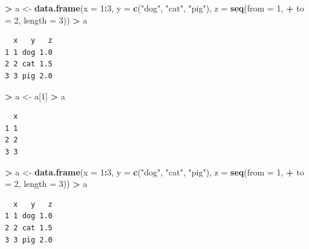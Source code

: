 \documentclass[]{krantz}
\makeatletter
\newenvironment{Shaded}{\begin{snugshade}}{\end{snugshade}}
\newcommand{\DataTypeTok}[1]{\textcolor[rgb]{0.27,0.27,0.27}{#1}}
\newcommand{\DecValTok}[1]{\textcolor[rgb]{0.06,0.06,0.06}{#1}}
\newcommand{\KeywordTok}[1]{\textcolor[rgb]{0.27,0.27,0.27}{\textbf{#1}}}
\newcommand{\NormalTok}[1]{#1}
\newcommand{\OperatorTok}[1]{\textcolor[rgb]{0.43,0.43,0.43}{\textbf{#1}}}
\newcommand{\StringTok}[1]{\textcolor[rgb]{0.5,0.5,0.5}{#1}}
\newenvironment{kframe}{%
\medskip{}
\setlength{\fboxsep}{.8em}
 \def\at@end@of@kframe{}%
 \ifinner\ifhmode%
  \def\at@end@of@kframe{\end{minipage}}%
  \begin{minipage}{\columnwidth}%
 \fi\fi%
 \def\FrameCommand##1{\hskip\@totalleftmargin \hskip-\fboxsep
 \colorbox{shadecolor}{##1}\hskip-\fboxsep
     \hskip-\linewidth \hskip-\@totalleftmargin \hskip\columnwidth}%
 \MakeFramed {\advance\hsize-\width
   \@totalleftmargin\z@ \linewidth\hsize
   \@setminipage}}%
 {\par\unskip\endMakeFramed%
 \at@end@of@kframe}
\renewenvironment{Shaded}{\begin{kframe}}{\end{kframe}}
\makeatother
\begin{document}
\begin{Shaded}
\begin{Highlighting}[]
\OperatorTok{>}\StringTok{ }\NormalTok{a <-}\StringTok{ }\KeywordTok{data.frame}\NormalTok{(}\DataTypeTok{x =} \DecValTok{1}\OperatorTok{:}\DecValTok{3}\NormalTok{, }\DataTypeTok{y =} \KeywordTok{c}\NormalTok{(}\StringTok{"dog"}\NormalTok{, }\StringTok{"cat"}\NormalTok{, }\StringTok{"pig"}\NormalTok{), }\DataTypeTok{z =} \KeywordTok{seq}\NormalTok{(}\DataTypeTok{from =} \DecValTok{1}\NormalTok{, }
\OperatorTok{+}\StringTok{   }\DataTypeTok{to =} \DecValTok{2}\NormalTok{, }\DataTypeTok{length =} \DecValTok{3}\NormalTok{))}
\OperatorTok{>}\StringTok{ }\NormalTok{a}
\end{Highlighting}
\end{Shaded}

\begin{verbatim}
  x   y   z
1 1 dog 1.0
2 2 cat 1.5
3 3 pig 2.0
\end{verbatim}

\begin{Shaded}
\begin{Highlighting}[]
\OperatorTok{>}\StringTok{ }\NormalTok{a <-}\StringTok{ }\NormalTok{a[}\DecValTok{1}\NormalTok{]}
\OperatorTok{>}\StringTok{ }\NormalTok{a}
\end{Highlighting}
\end{Shaded}

\begin{verbatim}
  x
1 1
2 2
3 3
\end{verbatim}

\begin{Shaded}
\begin{Highlighting}[]
\OperatorTok{>}\StringTok{ }\NormalTok{a <-}\StringTok{ }\KeywordTok{data.frame}\NormalTok{(}\DataTypeTok{x =} \DecValTok{1}\OperatorTok{:}\DecValTok{3}\NormalTok{, }\DataTypeTok{y =} \KeywordTok{c}\NormalTok{(}\StringTok{"dog"}\NormalTok{, }\StringTok{"cat"}\NormalTok{, }\StringTok{"pig"}\NormalTok{), }\DataTypeTok{z =} \KeywordTok{seq}\NormalTok{(}\DataTypeTok{from =} \DecValTok{1}\NormalTok{, }
\OperatorTok{+}\StringTok{   }\DataTypeTok{to =} \DecValTok{2}\NormalTok{, }\DataTypeTok{length =} \DecValTok{3}\NormalTok{))}
\OperatorTok{>}\StringTok{ }\NormalTok{a}
\end{Highlighting}
\end{Shaded}

\begin{verbatim}
  x   y   z
1 1 dog 1.0
2 2 cat 1.5
3 3 pig 2.0
\end{verbatim}
\end{document}
